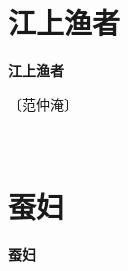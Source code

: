 \documentclass[12pt,UTF-8,openany,fontset=none]{ctexbook}
\begin{document}
\vspace{8pt}
\clearpage


\section{江上渔者}



\begin{center}
    {\bfseries 江上渔者}
\end{center}

\begin{center}
    \vspace{10pt}
    
    \begin{large}
        
        〔范仲淹〕
        
    \end{large}
    
    \vspace{8pt}
    
    \begin{huge}
        
        \phantom{。}

        \phantom{。}
        
        \phantom{。}~~

        \phantom{。}
        
    \end{huge}
    
\end{center}

\vspace{8pt}
\clearpage


\section{蚕妇}



\begin{center}
    {\bfseries 蚕妇}
\end{center}
\end{document}
